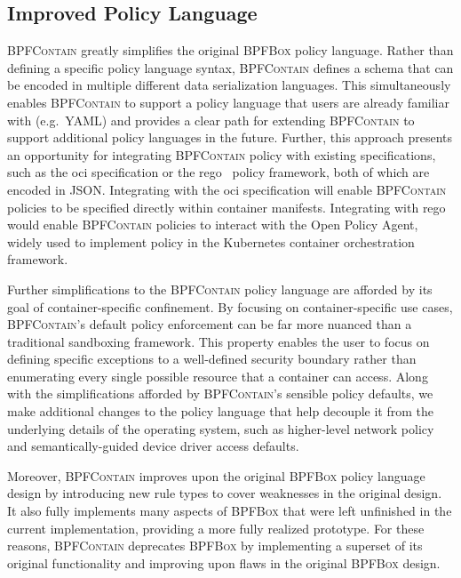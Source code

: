 \documentclass[
  fontsize=12pt,
  titlepage=firstiscover,
  paper=letter,
oneside,
  cleardoublepage=plain,
  parskip=half-,
  DIV=10,
  parindent,
  appendixprefix,
  chapterprefix,
  listof=totoc,
]{scrbook}
\newcommand{\bpfbox}{\textsc{BPFBox}}
\newcommand{\bpfcontain}{\textsc{BPFContain}}
\begin{document}
\subsection{Improved Policy Language}\label{ss:bpfcontain-simplified}

\bpfcontain{} greatly simplifies the original \bpfbox{} policy language. Rather than
defining a specific policy language syntax, \bpfcontain{} defines a schema that can be
encoded in multiple different data serialization languages.  This simultaneously enables
\bpfcontain{} to support a policy language that users are already familiar with (e.g.\ YAML)
and provides a clear path for extending \bpfcontain{} to support additional policy
languages in the future. Further, this approach presents an opportunity for integrating
\bpfcontain{} policy with existing specifications, such as the \gls{oci} specification or
the rego~\cite{rego} policy framework, both of which are encoded in JSON\@. Integrating
with the \gls{oci} specification will enable \bpfcontain{} policies to be specified
directly within container manifests. Integrating with rego would enable \bpfcontain{}
policies to interact with the Open Policy Agent, widely used to implement policy in the
Kubernetes container orchestration framework.

Further simplifications to the \bpfcontain{} policy language are afforded by its goal of
container-specific confinement. By focusing on container-specific use cases,
\bpfcontain{}'s default policy enforcement can be far more nuanced than a traditional
sandboxing framework. This property enables the user to focus on defining specific
exceptions to a well-defined security boundary rather than enumerating every single
possible resource that a container can access. Along with the simplifications afforded by
\bpfcontain{}'s sensible policy defaults, we make additional changes to the policy
language that help decouple it from the underlying details of the operating system, such
as higher-level network policy and semantically-guided device driver access defaults.

Moreover, \bpfcontain{} improves upon the original \bpfbox{} policy language design by
introducing new rule types to cover weaknesses in the original design. It also fully
implements many aspects of \bpfbox{} that were left unfinished in the current
implementation, providing a more fully realized prototype. For these reasons,
\bpfcontain{} deprecates \bpfbox{} by implementing a superset of its original
functionality and improving upon flaws in the original \bpfbox{} design.
\end{document}
